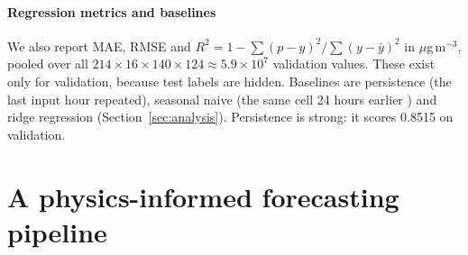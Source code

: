 \documentclass[10pt]{article}
\begin{document}
\paragraph{Regression metrics and baselines}
We also report MAE, RMSE and $R^2=1-\sum(p-y)^2/\sum(y-\bar y)^2$ in $\mu$g\,m$^{-3}$, pooled over all $214\times16\times140\times124\approx5.9\times10^{7}$ validation values. These exist only for validation, because test labels are hidden. Baselines are persistence (the last input hour repeated), seasonal naive (the same cell 24 hours earlier \citep{hyndman2021}) and ridge regression (Section~\ref{sec:analysis}). Persistence is strong: it scores 0.8515 on validation.

\section{A physics-informed forecasting pipeline}
\label{sec:method}
\end{document}
